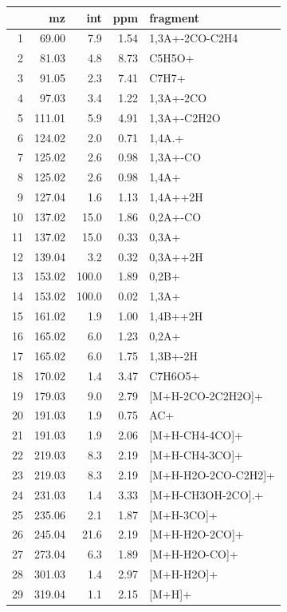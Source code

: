 \documentclass[]{article}
\begin{document}
\begin{table}[ht]
\centering
\begin{tabular}{rrrrl}
  \toprule
 & mz & int & ppm & fragment \\ 
  \midrule
1 & 69.00 & 7.9 & 1.54 & 1,3A+-2CO-C2H4 \\ 
  2 & 81.03 & 4.8 & 8.73 & C5H5O+ \\ 
  3 & 91.05 & 2.3 & 7.41 & C7H7+ \\ 
  4 & 97.03 & 3.4 & 1.22 & 1,3A+-2CO \\ 
  5 & 111.01 & 5.9 & 4.91 & 1,3A+-C2H2O \\ 
  6 & 124.02 & 2.0 & 0.71 & 1,4A.+ \\ 
  7 & 125.02 & 2.6 & 0.98 & 1,3A+-CO \\ 
  8 & 125.02 & 2.6 & 0.98 & 1,4A+ \\ 
  9 & 127.04 & 1.6 & 1.13 & 1,4A++2H \\ 
  10 & 137.02 & 15.0 & 1.86 & 0,2A+-CO \\ 
  11 & 137.02 & 15.0 & 0.33 & 0,3A+ \\ 
  12 & 139.04 & 3.2 & 0.32 & 0,3A++2H \\ 
  13 & 153.02 & 100.0 & 1.89 & 0,2B+ \\ 
  14 & 153.02 & 100.0 & 0.02 & 1,3A+ \\ 
  15 & 161.02 & 1.9 & 1.00 & 1,4B++2H \\ 
  16 & 165.02 & 6.0 & 1.23 & 0,2A+ \\ 
  17 & 165.02 & 6.0 & 1.75 & 1,3B+-2H \\ 
  18 & 170.02 & 1.4 & 3.47 & C7H6O5+ \\ 
  19 & 179.03 & 9.0 & 2.79 & [M+H-2CO-2C2H2O]+ \\ 
  20 & 191.03 & 1.9 & 0.75 & AC+ \\ 
  21 & 191.03 & 1.9 & 2.06 & [M+H-CH4-4CO]+ \\ 
  22 & 219.03 & 8.3 & 2.19 & [M+H-CH4-3CO]+ \\ 
  23 & 219.03 & 8.3 & 2.19 & [M+H-H2O-2CO-C2H2]+ \\ 
  24 & 231.03 & 1.4 & 3.33 & [M+H-CH3OH-2CO].+ \\ 
  25 & 235.06 & 2.1 & 1.87 & [M+H-3CO]+ \\ 
  26 & 245.04 & 21.6 & 2.19 & [M+H-H2O-2CO]+ \\ 
  27 & 273.04 & 6.3 & 1.89 & [M+H-H2O-CO]+ \\ 
  28 & 301.03 & 1.4 & 2.97 & [M+H-H2O]+ \\ 
  29 & 319.04 & 1.1 & 2.15 & [M+H]+ \\ 
   \bottomrule
\end{tabular}
\end{table}
\end{document}
